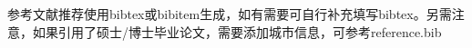 \song\wuhao
\setmainfont{SIMSUN.TTC}
\linespread{1.25}
\label{reference}
\sloppy{}

参考文献推荐使用bibtex或bibitem生成，如有需要可自行补充填写bibtex。另需注意，如果引用了硕士/博士毕业论文，需要添加城市信息，可参考reference.bib







\vspace{17.06pt}



\setmainfont[Mapping=tex-text]{Times New Roman}